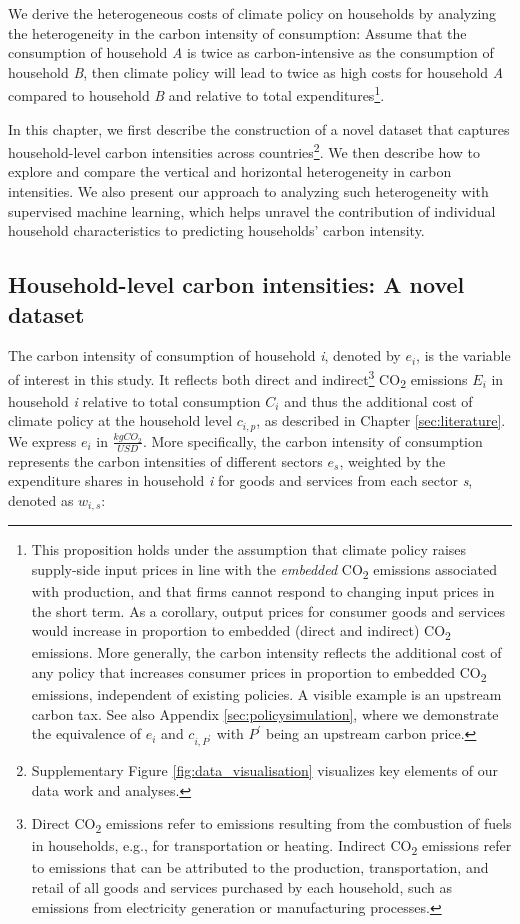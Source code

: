 \documentclass[12pt, a4paper]{article}
\begin{document}
We derive the heterogeneous costs of climate policy on households by analyzing the heterogeneity in the carbon intensity of consumption: Assume that the consumption of household \textit{A} is twice as carbon-intensive as the consumption of household \textit{B}, then climate policy will lead to twice as high costs for household \textit{A} compared to household \textit{B} and relative to total expenditures\footnote{This proposition holds under the assumption that climate policy raises supply-side input prices in line with the \textit{embedded} CO\textsubscript{2} emissions associated with production, and that firms cannot respond to changing input prices in the short term. As a corollary, output prices for consumer goods and services would increase in proportion  to embedded (direct and indirect) CO\textsubscript{2} emissions. More generally, the carbon intensity reflects the additional cost of any policy that increases consumer prices in proportion to embedded CO\textsubscript{2} emissions, independent of existing policies. A visible example is an upstream carbon tax. See also Appendix \ref{sec:policysimulation}, where we demonstrate the equivalence of $e_{i}$ and $c_{i,P^{\prime}}$ with $P^{\prime}$ being an upstream carbon price.}.

In this chapter, we first describe the construction of a novel dataset that captures household-level carbon intensities across countries\footnote{Supplementary Figure \ref{fig:data_visualisation} visualizes key elements of our data work and analyses.}. We then describe how to explore and compare the vertical and horizontal heterogeneity in carbon intensities. We also present our approach to analyzing such heterogeneity with supervised machine learning, which helps unravel the contribution of individual household characteristics to predicting households' carbon intensity.

\subsection{Household-level carbon intensities: A novel dataset} \label{sec:data}

The carbon intensity of consumption of household \textit{i}, denoted by $e_{i}$, is the variable of interest in this study. It reflects both direct and indirect\footnote{Direct CO\textsubscript{2} emissions refer to emissions resulting from the combustion of fuels in households, e.g., for transportation or heating. Indirect CO\textsubscript{2} emissions refer to emissions that can be attributed to the production, transportation, and retail of all goods and services purchased by each household, such as emissions from electricity generation or manufacturing processes.} CO\textsubscript{2} emissions $E_{i}$ in household \textit{i} relative to total consumption $C_{i}$ and thus the additional cost of climate policy at the household level $c_{i,p}$, as described in Chapter \ref{sec:literature}. We express $e_{i}$ in $\frac{kgCO_{2}}{USD}$. More specifically, the carbon intensity of consumption represents the carbon intensities of different sectors $e_{s}$, weighted by the expenditure shares in household \textit{i} for goods and services from each sector \textit{s}, denoted as $w_{i,s}$:
\end{document}
